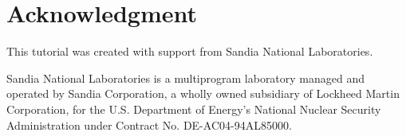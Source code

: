 \section{Acknowledgment}
 This tutorial was created with support from Sandia National Laboratories.

 Sandia National Laboratories is a multiprogram laboratory managed and operated by
 Sandia Corporation, a wholly owned subsidiary of Lockheed Martin Corporation, for
 the U.S. Department of Energy's National Nuclear Security Administration under
 Contract No. DE-AC04-94AL85000.
